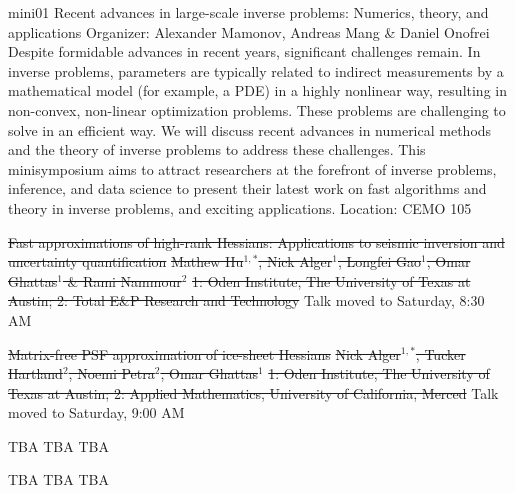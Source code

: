 \mini
{mini01}
{Recent advances in large-scale inverse problems: Numerics, theory, and applications}
{Organizer: Alexander Mamonov, Andreas Mang \& Daniel Onofrei}
{Despite formidable advances in recent years, significant challenges remain. In inverse problems, parameters are typically related to indirect measurements by a mathematical model (for example, a PDE) in a highly nonlinear way, resulting in non-convex, non-linear optimization problems. These problems are challenging to solve in an efficient way. We will discuss recent advances in numerical methods and the theory of inverse problems to address these challenges. This minisymposium aims to attract researchers at the forefront of inverse problems, inference, and data science to present their latest work on fast algorithms and theory in inverse problems, and exciting applications.}
{Location: CEMO 105}


\begin{talks}
\item\talk
{\st{Fast approximations of high-rank Hessians: Applications to seismic inversion and uncertainty quantification}}
{\st{Mathew Hu$^{1,*}$, Nick Alger$^{1}$, Longfei Gao$^{1}$, Omar Ghattas$^{1}$ \& Rami Nammour$^{2}$}}
{\st{1: Oden Institute, The University of Texas at Austin; 2: Total E\&P Research and Technology} {\color{p1color}Talk moved to Saturday, 8:30 AM}}
\item\talk
{\st{Matrix-free PSF approximation of ice-sheet Hessians}}
{\st{Nick Alger$^{1,*}$, Tucker Hartland$^{2}$, Noemi Petra$^{2}$, Omar Ghattas$^{1}$}}
{\st{1: Oden Institute, The University of Texas at Austin; 2: Applied Mathematics, University of California, Merced} {\color{p1color}Talk moved to Saturday, 9:00 AM}}
\item\talk
{TBA}
{TBA}
{TBA}
\item\talk
{TBA}
{TBA}
{TBA}
\end{talks}

\room
